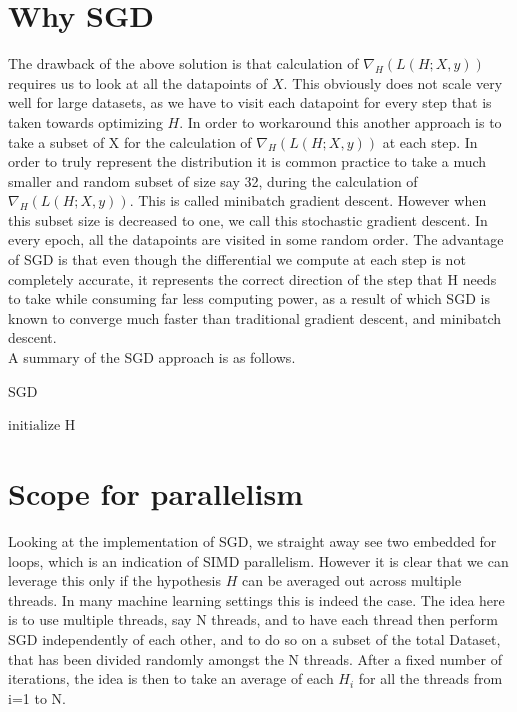 \documentclass{article}
\begin{document}
\section{Why SGD} %
The drawback of the above solution is that calculation of $\nabla_{H}(L(H;X,y))$ requires us to look at all the datapoints of $X$. This obviously does not scale very well for large datasets, as we have to visit each datapoint for every step that is taken towards optimizing $H$. In order to workaround this another approach is to take a subset of X for the calculation of $\nabla_{H}(L(H;X,y))$ at each step. In order to truly represent the distribution it is common practice to take a much smaller and random subset of size say 32, during the calculation of $\nabla_{H}(L(H;X,y))$. This is called minibatch gradient descent. However when this subset size is decreased to one, we call this stochastic gradient descent. In every epoch, all the datapoints are visited in some random order. The advantage of SGD is that even though the differential we compute at each step is not completely accurate, it represents the correct direction of the step that H needs to take while consuming far less computing power, as a result of which SGD is known to converge much faster than traditional gradient descent, and minibatch descent.
\\
A summary of the SGD approach is as follows.\\

\begin{algorithm}
	\caption{SGD}\label{sgd}
	\begin{algorithmic}[1]
		\State $\text{initialize H}$
		\EndFor
		\EndFor
		
		
		\EndProcedure
	\end{algorithmic}
\end{algorithm}


\newpage

\section{Scope for parallelism} %
Looking at the implementation of SGD, we straight away see two embedded for loops, which is an indication of  SIMD parallelism. However it is clear that we can leverage this only if the hypothesis $H$ can be averaged out across multiple threads. In many machine learning settings this is indeed the case. The idea here is to use multiple threads, say N threads, and to have each thread then perform SGD independently of each other, and to do so on a subset of the total Dataset, that has been divided randomly amongst the N threads. After a fixed number of iterations, the idea is then to take an average of each $H_i$ for all the threads from i=1 to N. 
\end{document}
